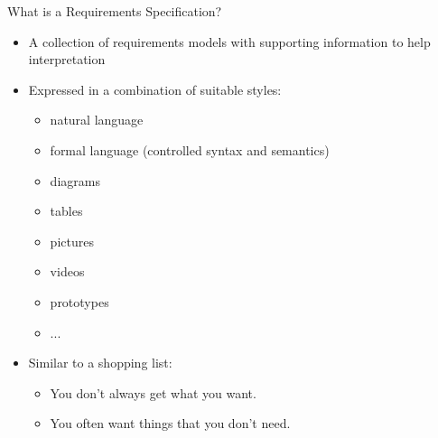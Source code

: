 
\begin{Slide}{What is a Requirements Specification?}

\begin{itemize}
\item A collection of requirements models with supporting information to help interpretation

\item Expressed in a combination of suitable styles:
\begin{itemize}
\item natural language
\item formal language (controlled syntax and semantics)
\item diagrams
\item tables
\item pictures
\item videos
\item prototypes
\item ...

\end{itemize}
\item Similar to a shopping list:
\begin{itemize}
\item You don't always get what you want.
\item You often want things that you don't need.

\end{itemize}
\end{itemize}
\end{Slide}
